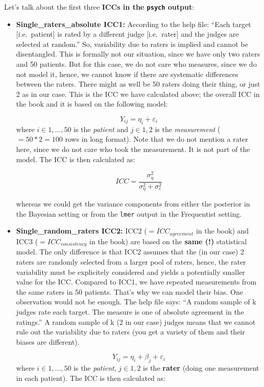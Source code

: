 \documentclass[
]{article}
\begin{document}
Let's talk about the first three \textbf{ICCs in the \texttt{psych} output}:

\begin{itemize}
\item
  \textbf{Single\_raters\_absolute ICC1:}
  According to the help file: ``Each target {[}i.e.~patient{]} is rated by a different
  judge {[}i.e.~rater{]} and the judges are selected at random.'' So, variability due to raters
  is implied and cannot be disentangled.
  This is formally not our situation, since we have only two raters and
  50 patients. But for this case, we do not care who measures, since we do not
  model it, hence, we cannot know if there are systematic differences between
  the raters. There might as well be 50 raters doing their thing, or just 2 as in our case.
  This is the ICC we have calculated above; the overall ICC
  in the book and it is based on the following model:

  \[Y_{ij} = \eta_i + \varepsilon_i\]
  where \(i \in {1,...,50}\) is the \emph{patient} and \(j \in {1,2}\) is the \emph{measurement}
  (\(=50*2=100\) rows in long format).
  Note that we do not mention a rater here, since we do not care who took the
  measurement. It is not part of the model. The ICC is then calculated as:

  \[ICC = \frac{\sigma_{\eta}^2}{\sigma_{\eta}^2 + \sigma_{\varepsilon}^2}\]

  whereas we could get the variance components from either the posterior in the Bayesian
  setting or from the \texttt{lmer} output in the Frequentist setting.
\item
  \textbf{Single\_random\_raters ICC2:}
  ICC2 (\(=ICC_{agreement}\) in the book) and ICC3 (\(=ICC_{consistency}\) in the book)
  are based on the \textbf{same (!)} statistical model. The only difference is
  that ICC2 assumes that the (in our case) 2 raters are randomly selected from a larger pool of raters,
  hence, the rater variability must be explicitely considered and yields a potentially smaller
  value for the ICC. Compared to ICC1, we have repeated measurements from the same raters
  in 50 patients. That's why we can model their bias. One observation would not be enough.
  The help file says: ``A random sample of k judges rate each target.
  The measure is one of absolute agreement in the ratings.''
  A random sample of k (2 in our case) judges means that we cannot rule out the variability
  due to raters (you get a variety of them and their biases are different).

  \[Y_{ij} = \eta_i + \beta_j + \varepsilon_i\]
  where \(i \in {1,...,50}\) is the \emph{patient}, \(j \in {1,2}\) is the \textbf{rater}
  (doing one measurement in each patient). The ICC is then calculated as:


\end{itemize}
\end{document}
